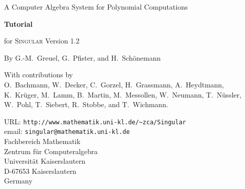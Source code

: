 \documentclass[a4paper,german]{article}
\begin{document}

\begin{center}

\begin{figure}[h]
\noindent
\centering{}
\end{figure}

    {\Large A Computer Algebra System for Polynomial Computations}

\vspace{15ex}

\Huge{\textbf{Tutorial}}

\huge{for \textsc{Singular} Version 1.2}

\vspace{5ex}

\Large{By G.-M.~Greuel, G.~Pfister, and H.~Sch\"onemann}
\end{center}

\begin{center}
  \large{With contributions by} \\
\large{O.~Bachmann, W.~Decker, C.~Gorzel,
  H.~Grassmann, A.~Heydtmann, K.~Kr\"uger, M.~Lamm, B.~Martin,
  M.~Messollen, W.~Neumann, T.~N\"ussler, W.~Pohl, T.~Siebert,
  R.~Stobbe, and T.~Wichmann.}
\end{center}

\vspace{20ex}

\begin{center}
  \large{
    URL: \verb?http://www.mathematik.uni-kl.de/~zca/Singular? \\
    email: \verb?singular@mathematik.uni-kl.de?\\
    Fachbereich Mathematik \\
    Zentrum f\"ur Computeralgebra \\
    Universit\"at Kaiserslautern \\
    D-67653 Kaiserslautern \\
    Germany}
\end{center}
\end{document}
